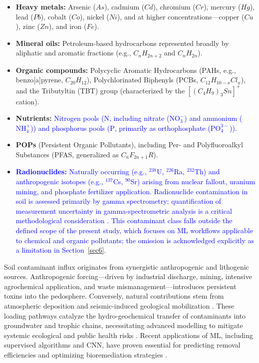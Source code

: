 \documentclass[environments,article,submit,pdftex,moreauthors]{Definitions/mdpi}
\begin{document}
\begin{itemize}
    \item \textbf{Heavy metals:} Arsenic ($As$), cadmium ($Cd$), chromium ($Cr$),
        mercury ($Hg$), lead ($Pb$), cobalt ($Co$), nickel ($Ni$), and at higher
        concentrations---copper ($Cu$), zinc ($Zn$), and iron ($Fe$).
    \item \textbf{Mineral oils:} Petroleum-based hydrocarbons represented broadly
        by aliphatic and aromatic fractions (e.g., $C_nH_{2n+2}$ and $C_nH_{2n}$).
    \item \textbf{Organic compounds:} Polycyclic Aromatic Hydrocarbons (PAHs,
        e.g., benzo[a]pyrene, $C_{20}H_{12}$), Polychlorinated Biphenyls
        (PCBs, $C_{12}H_{10-x}Cl_x$), and the Tributyltin (TBT) group
        (characterized by the $[(C_4H_9)_3Sn]^+$ cation).
    \item \textbf{Nutrients:} \textcolor{blue}{Nitrogen pools ($\mathrm{N}$, including nitrate ($\mathrm{NO_3^-}$) and ammonium ($\mathrm{NH_4^+}$)) and phosphorus pools ($\mathrm{P}$, primarily as orthophosphate ($\mathrm{PO_4^{3-}}$)).}
    \item \textbf{POPs} (Persistent Organic Pollutants), including Per- and
        Polyfluoroalkyl Substances (PFAS, generalized as $C_nF_{2n+1}R$).
    \item \textcolor{blue}{\textbf{Radionuclides:} Naturally occurring (e.g., $^{238}$U, $^{226}$Ra, $^{232}$Th) and anthropogenic isotopes (e.g., $^{137}$Cs, $^{90}$Sr) arising from nuclear fallout, uranium mining, and phosphate fertilizer application. Radionuclide contamination in soil is assessed primarily by gamma spectrometry; quantification of measurement uncertainty in gamma-spectrometric analysis is a critical methodological consideration \cite{Dragovi2005}. This contaminant class falls outside the defined scope of the present study, which focuses on ML workflows applicable to chemical and organic pollutants; the omission is acknowledged explicitly as a limitation in Section~\ref{sec6}.}
\end{itemize}

Soil contaminant influx originates from synergistic anthropogenic and
lithogenic sources. Anthropogenic forcing---driven by industrial discharge,
mining, intensive agrochemical application, and waste mismanagement---introduces
persistent toxins into the pedosphere. Conversely, natural contributions stem from atmospheric deposition and
seismic-induced geological mobilization \cite{Binetti2026}. These
loading pathways catalyze the hydro-geochemical transfer of contaminants into
groundwater and trophic chains, necessitating advanced modelling to mitigate
systemic ecological and public health risks \cite{Elmotawakkil2025,Sanad2026}.
Recent applications of ML, including supervised algorithms and CNN, have proven
essential for predicting removal efficiencies and optimizing bioremediation
strategies \cite{Okafor2026,Pace2026}.
\end{document}
